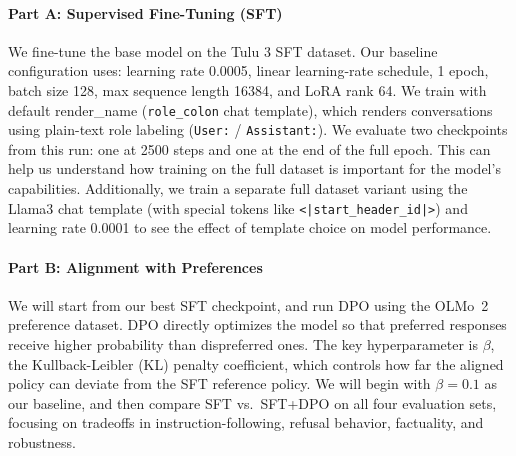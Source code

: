 \documentclass[11pt]{article}
\begin{document}
\paragraph{Part A: Supervised Fine-Tuning (SFT)}
We fine-tune the base model on the Tulu 3 SFT dataset. Our baseline configuration uses: learning rate 0.0005, linear learning-rate schedule, 1 epoch, batch size 128, max sequence length 16384, and LoRA rank 64. We train with default render\_name (\texttt{role\_colon} chat template), which renders conversations using plain-text role labeling (\texttt{User:} / \texttt{Assistant:}). 
We evaluate two checkpoints from this run: one at 2500 steps and one at the end of the full epoch. This can help us understand how training on the full dataset is important for the model's capabilities. Additionally, we train a separate full dataset variant using the Llama3 chat template (with special tokens like \texttt{<|start\_header\_id|>}) and learning rate 0.0001 to see the effect of template choice on model performance.
\paragraph{Part B: Alignment with Preferences}
We will start from our best SFT checkpoint, and run DPO using the OLMo~2 preference dataset. DPO directly optimizes the model so that preferred responses receive higher probability than dispreferred ones. The key hyperparameter is $\beta$, the Kullback-Leibler (KL) penalty coefficient, which controls how far the aligned policy can deviate from the SFT reference policy. We will begin with $\beta = 0.1$ as our baseline, and then compare SFT vs.\ SFT+DPO on all four evaluation sets, focusing on tradeoffs in instruction-following, refusal behavior, factuality, and robustness.
 
\end{document}
